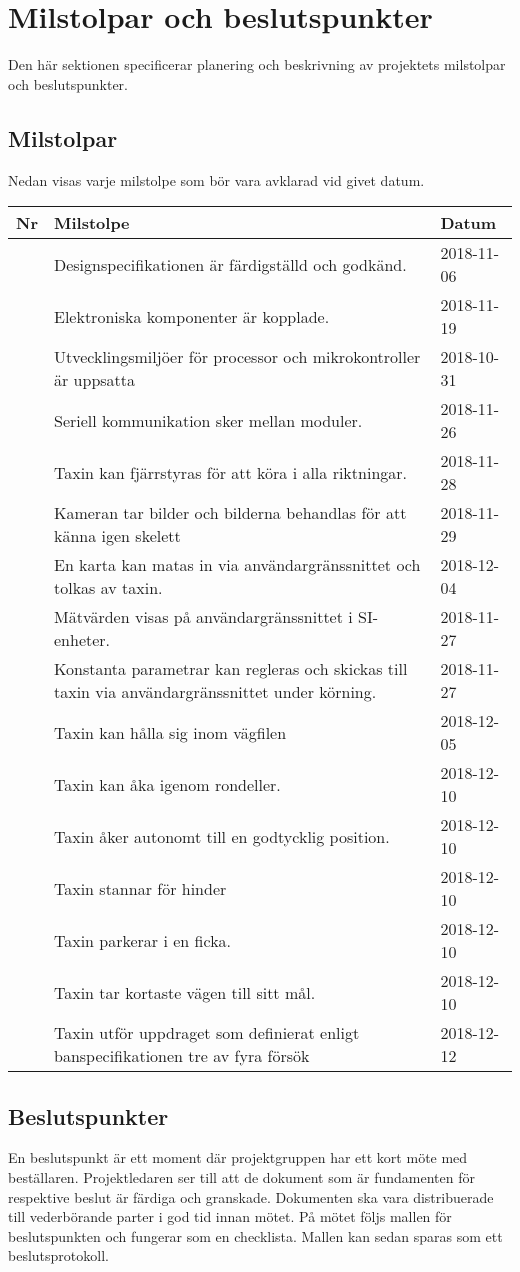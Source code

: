 \documentclass[projektplan/plan.tex]{subfiles}
\newcounter{milestoneNo} %
\newenvironment{milestonelist}
{
    \setlength{\tabcolsep}{12pt}
    \renewcommand{\arraystretch}{1.6}
    \begin{longtable}{p{8mm}p{105mm}p{25mm}}
        \bfseries Nr &
        \bfseries Milstolpe &
        \bfseries Datum 
	\\\hline\endhead
}{
    \end{longtable}
}
\newcommand{\milestone}[2]{
    \stepcounter{milestoneNo}
    \arabic{milestoneNo} & #1     & #2 \\
}
\begin{document}
\section{Milstolpar och beslutspunkter}
Den här sektionen specificerar planering och beskrivning av projektets milstolpar
och beslutspunkter.

\subsection{Milstolpar}
Nedan visas varje milstolpe som bör vara avklarad vid givet datum.
\begin{milestonelist}
    \milestone{Designspecifikationen är färdigställd och godkänd.}{2018-11-06}
    \milestone{Elektroniska komponenter är kopplade.}{2018-11-19}
    \milestone{Utvecklingsmiljöer för processor och mikrokontroller är
    uppsatta}{2018-10-31}
    \milestone{Seriell kommunikation sker mellan moduler.}{2018-11-26}
    \milestone{Taxin kan fjärrstyras för att köra i alla
    riktningar.}{2018-11-28}
    \milestone{Kameran tar bilder och bilderna behandlas för att känna igen
    skelett}{2018-11-29}
    \milestone{En karta kan matas in via användargränssnittet och tolkas av
    taxin.}{2018-12-04}
    \milestone{Mätvärden visas på användargränssnittet i
    SI-enheter.}{2018-11-27}
    \milestone{Konstanta parametrar kan regleras och skickas till taxin via
    användargränssnittet under körning.}{2018-11-27}
    \milestone{Taxin kan hålla sig inom vägfilen}{2018-12-05}
    \milestone{Taxin kan åka igenom rondeller.}{2018-12-10}
    \milestone{Taxin åker autonomt till en godtycklig position.}{2018-12-10}
    \milestone{Taxin stannar för hinder}{2018-12-10}
    \milestone{Taxin parkerar i en ficka.}{2018-12-10}
    \milestone{Taxin tar kortaste vägen till sitt mål.}{2018-12-10}
    \milestone{Taxin utför uppdraget som definierat enligt banspecifikationen
    tre av fyra försök}{2018-12-12}
\end{milestonelist}

\subsection{Beslutspunkter}
En beslutspunkt är ett moment där projektgruppen har ett kort möte med
beställaren. Projektledaren ser till att de dokument som är fundamenten för
respektive beslut är färdiga och granskade. Dokumenten ska vara distribuerade
till vederbörande parter i god tid innan mötet. På mötet följs mallen för
beslutspunkten och fungerar som en checklista. Mallen kan sedan sparas som ett
beslutsprotokoll.
\end{document}
